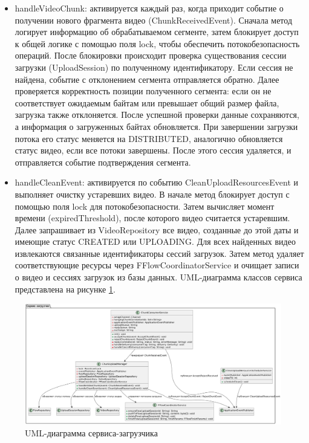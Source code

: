 	\begin{itemize}[label=$\bullet$]
		\item handleVideoChunk: активируется каждый раз, когда приходит событие о получении нового фрагмента видео (ChunkReceivedEvent). Сначала метод логирует информацию об обрабатываемом сегменте, затем блокирует доступ к общей логике с помощью поля lock, чтобы обеспечить потокобезопасность операций. После блокировки происходит проверка существования сессии загрузки (UploadSession) по полученному идентификатору. Если сессия не найдена, событие с отклонением сегмента отправляется обратно. Далее проверяется корректность позиции полученного сегмента: если он не соответствует ожидаемым байтам или превышает общий размер файла, загрузка также отклоняется. После успешной проверки данные сохраняются, а информация о загруженных байтах обновляется. При завершении загрузки потока его статус меняется на DISTRIBUTED, аналогично обновляется статус видео, если все потоки завершены. После этого сессия удаляется, и отправляется событие подтверждения сегмента.
		\item handleCleanEvent: активируется по событию CleanUploadResourcesEvent и выполняет очистку устаревших видео. В начале метод блокирует доступ с помощью поля lock для потокобезопасности. Затем вычисляет момент времени (expiredThreshold), после которого видео считается устаревшим. Далее запрашивает из VideoRepository все видео, созданные до этой даты и имеющие статус CREATED или UPLOADING. Для всех найденных видео извлекаются связанные идентификаторы сессий загрузок. Затем метод удаляет соответствующие ресурсы через FFlowCoordinatorService и очищает записи о видео и сессиях загрузок из базы данных.
		UML-диаграмма классов сервиса представлена на рисунке \ref{fig:uml_uploader}.
	\end{itemize}

	\begin{figure}[ht!] 
		\center
		\includegraphics [scale=0.3] {my_folder/images//uml_uploader}
		\caption{UML-диаграмма сервиса-загрузчика} 
		\label{fig:uml_uploader}  
	\end{figure}
	
